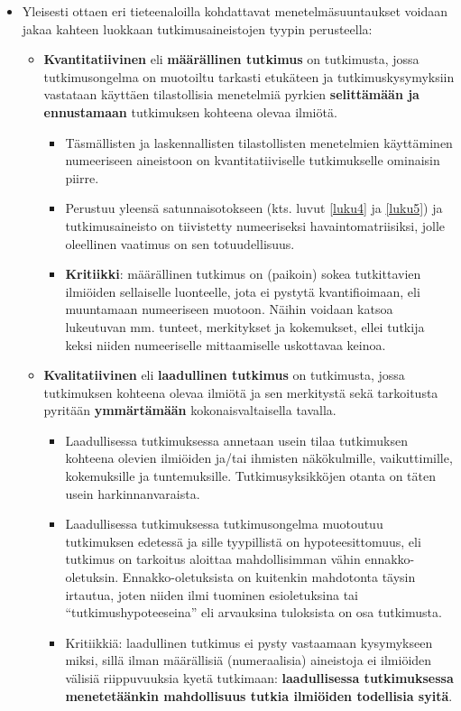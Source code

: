 \documentclass[
]{book}
\providecommand{\tightlist}{%
  \setlength{\itemsep}{0pt}\setlength{\parskip}{0pt}}
\begin{document}
\begin{itemize}
\tightlist
\item
  Yleisesti ottaen eri tieteenaloilla kohdattavat menetelmäsuuntaukset voidaan jakaa kahteen luokkaan tutkimusaineistojen tyypin perusteella:

  \begin{itemize}
  \tightlist
  \item
    \textbf{Kvantitatiivinen} eli \textbf{määrällinen tutkimus} on tutkimusta, jossa tutkimusongelma on muotoiltu tarkasti etukäteen ja tutkimuskysymyksiin vastataan käyttäen tilastollisia menetelmiä pyrkien \textbf{selittämään ja ennustamaan} tutkimuksen kohteena olevaa ilmiötä.

    \begin{itemize}
    \tightlist
    \item
      Täsmällisten ja laskennallisten tilastollisten menetelmien käyttäminen numeeriseen aineistoon on kvantitatiiviselle tutkimukselle ominaisin piirre.
    \item
      Perustuu yleensä satunnaisotokseen (kts. luvut \ref{luku4} ja \ref{luku5}) ja tutkimusaineisto on tiivistetty numeeriseksi havaintomatriisiksi, jolle oleellinen vaatimus on sen totuudellisuus.
    \item
      \textbf{Kritiikki}: määrällinen tutkimus on (paikoin) sokea tutkittavien ilmiöiden sellaiselle luonteelle, jota ei pystytä kvantifioimaan, eli muuntamaan numeeriseen muotoon. Näihin voidaan katsoa lukeutuvan mm. tunteet, merkitykset ja kokemukset, ellei tutkija keksi niiden numeeriselle mittaamiselle uskottavaa keinoa.\\
    \end{itemize}
  \item
    \textbf{Kvalitatiivinen} eli \textbf{laadullinen tutkimus} on tutkimusta, jossa tutkimuksen kohteena olevaa ilmiötä ja sen merkitystä sekä tarkoitusta pyritään \textbf{ymmärtämään} kokonaisvaltaisella tavalla.

    \begin{itemize}
    \tightlist
    \item
      Laadullisessa tutkimuksessa annetaan usein tilaa tutkimuksen kohteena olevien ilmiöiden ja/tai ihmisten näkökulmille, vaikuttimille, kokemuksille ja tuntemuksille. Tutkimusyksikköjen otanta on täten usein harkinnanvaraista.
    \item
      Laadullisessa tutkimuksessa tutkimusongelma muotoutuu tutkimuksen edetessä ja sille tyypillistä on hypoteesittomuus, eli tutkimus on tarkoitus aloittaa mahdollisimman vähin ennakko-oletuksin. Ennakko-oletuksista on kuitenkin mahdotonta täysin irtautua, joten niiden ilmi tuominen esioletuksina tai ``tutkimushypoteeseina'' eli arvauksina tuloksista on osa tutkimusta.
    \item
      Kritiikkiä: laadullinen tutkimus ei pysty vastaamaan kysymykseen miksi, sillä ilman määrällisiä (numeraalisia) aineistoja ei ilmiöiden välisiä riippuvuuksia kyetä tutkimaan: \textbf{laadullisessa tutkimuksessa menetetäänkin mahdollisuus tutkia ilmiöiden todellisia syitä}.


\end{itemize}
\end{itemize}
\end{itemize}
\end{document}
